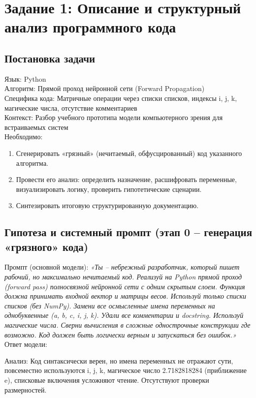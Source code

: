 \newpage
\section*{Задание 1: Описание и структурный анализ программного кода}
\subsection{Постановка задачи}
\noindent
Язык: Python \\
Алгоритм: Прямой проход нейронной сети (Forward Propagation) \\
Специфика кода: Матричные операции через списки списков, индексы i, j, k, магические числа, отсутствие комментариев \\
Контекст: Разбор учебного прототипа модели компьютерного зрения для встраиваемых систем\\
\newline
Необходимо:
\begin{enumerate}
	\item Сгенерировать «грязный» (нечитаемый, обфусцированный) код указанного алгоритма.
	\item Провести его анализ: определить назначение, расшифровать переменные, визуализировать логику, проверить гипотетические сценарии.
	\item Синтезировать итоговую структурированную документацию.
\end{enumerate}
\subsection{Гипотеза и системный промпт (этап 0 – генерация «грязного» кода)}
Промпт (основной модели):
\textit{«Ты – небрежный разработчик, который пишет рабочий, но максимально нечитаемый код. Реализуй на Python прямой проход (forward pass) полносвязной нейронной сети с одним скрытым слоем. Функция должна принимать входной вектор и матрицы весов. Используй только списки списков (без NumPy). Замени все осмысленные имена переменных на однобуквенные (a, b, c, i, j, k). Удали все комментарии и docstring. Используй магические числа. Сверни вычисления в сложные однострочные конструкции где возможно. Код должен быть логически верным и запускаться без ошибок.»}\\
\newpage
Ответ модели: 

\noindent
\indent Анализ: Код синтаксически верен, но имена переменных не отражают сути, повсеместно используются i, j, k, магическое число 2.7182818284 (приближение e), списковые включения усложняют чтение. Отсутствуют проверки размерностей.
